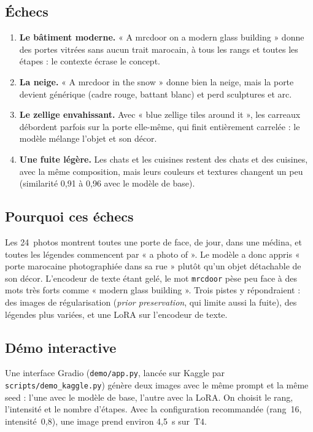 \documentclass[11pt,a4paper]{article}
\newcommand{\code}[1]{\texttt{\small #1}}
\newcommand{\trig}{\code{mrcdoor}}
\begin{document}
\subsection*{Échecs}
\begin{enumerate}
  \item \textbf{Le bâtiment moderne.} « A mrcdoor on a modern glass building » donne des portes vitrées sans aucun trait marocain, à tous les rangs et toutes les étapes : le contexte écrase le concept.
  \item \textbf{La neige.} « A mrcdoor in the snow » donne bien la neige, mais la porte devient générique (cadre rouge, battant blanc) et perd sculptures et arc.
  \item \textbf{Le zellige envahissant.} Avec « blue zellige tiles around it », les carreaux débordent parfois sur la porte elle-même, qui finit entièrement carrelée : le modèle mélange l'objet et son décor.
  \item \textbf{Une fuite légère.} Les chats et les cuisines restent des chats et des cuisines, avec la même composition, mais leurs couleurs et textures changent un peu (similarité 0,91 à 0,96 avec le modèle de base).
\end{enumerate}

\subsection*{Pourquoi ces échecs}
Les 24~photos montrent toutes une porte de face, de jour, dans une médina, et toutes les légendes commencent par « a photo of ». Le modèle a donc appris « porte marocaine photographiée dans sa rue » plutôt qu'un objet détachable de son décor. L'encodeur de texte étant gelé, le mot \trig{} pèse peu face à des mots très forts comme « modern glass building ». Trois pistes y répondraient : des images de régularisation (\emph{prior preservation}, qui limite aussi la fuite), des légendes plus variées, et une LoRA sur l'encodeur de texte.

\subsection*{Démo interactive}
Une interface Gradio (\code{demo/app.py}, lancée sur Kaggle par \code{scripts/demo\_kaggle.py}) génère deux images avec le même prompt et la même seed : l'une avec le modèle de base, l'autre avec la LoRA. On choisit le rang, l'intensité et le nombre d'étapes. Avec la configuration recommandée (rang~16, intensité~0,8), une image prend environ 4,5~s sur~T4.
\end{document}
